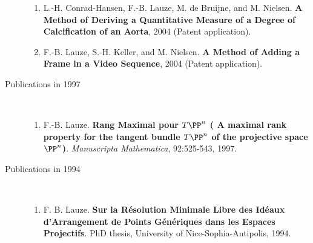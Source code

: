 \documentclass[10pt]{article}
\begin{document}
\begin{description}
\begin{enumerate}
  \item L.-H. Conrad-Hansen, F.-B. Lauze, M. de Bruijne, and M. Nielsen.  \textbf{A Method
      of Deriving a Quantitative Measure of a Degree of Calcification of an Aorta}, 2004
    (Patent application).

  \item F.-B. Lauze, S.-H. Keller, and M. Nielsen.  \textbf{A Method of Adding a Frame in
      a Video Sequence}, 2004 (Patent application).

  \end{enumerate}

\item[Publications in 1997]~\\
  \begin{enumerate}
  \item F.-B. Lauze.  \textbf{Rang Maximal pour $T\PP^n$ ( A maximal rank property for the
      tangent bundle $T\PP^n$ of the projective space $\PP^n$)}.  \textit{Manuscripta
      Mathematica}, 92:525-543, 1997.
  \end{enumerate}

\item[Publications in 1994]~\\
  \begin{enumerate}
  
  \item F. B. Lauze.  \textbf{Sur la R{\'e}solution Minimale Libre des Id{\'e}aux
      d'Arrangement de Points G{\'e}n{\'e}riques dans les Espaces Projectifs}.  PhD
    thesis, University of Nice-Sophia-Antipolis, 1994.

  \end{enumerate}

\end{description}
\end{document}
